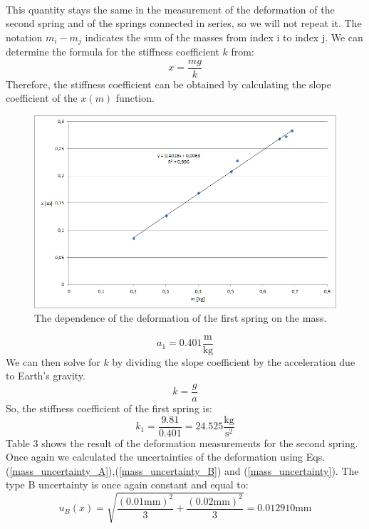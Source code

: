 \documentclass[a4paper,12pt,titlepage,bibliography=numbered]{article}
\begin{document}
\noindent \\This quantity stays the same in the measurement of the deformation of the second spring and of the springs connected in series, so we will not repeat it. The notation \(m_i - m_j\) indicates the sum of the masses from index i to index j. We can determine the formula for the stiffness coefficient \(k\) from:
\begin{equation}
    x = \frac{mg}{k}
\end{equation}
Therefore, the stiffness coefficient can be obtained by calculating the slope coefficient of the $x(m)$ function.
\begin{figure}[H]
\centering
\includegraphics[width=1\textwidth]{fig1.png}
\caption{The dependence of the deformation of the first spring on the mass.}
\label{fig_1}
\end{figure}
\begin{equation}
    a_1 = 0.401 \mathrm{\frac{m}{kg}}
\end{equation}
We can then solve for $k$ by dividing the slope coefficient by the acceleration due to Earth's gravity. \\
\begin{equation}
    k = \frac{g}{a}
    \label{slope_to_stiffness}
\end{equation}
So, the stiffness coefficient of the first spring is: 
\begin{equation}
    k_1 = \frac{9.81}{0.401} = 24.525 \mathrm{\frac{kg}{s^2}}
\end{equation}
\noindent Table 3 shows the result of the deformation measurements for the second spring. Once again we calculated the uncertainties of the deformation using Eqs. (\ref{mass_uncertainty_A}),(\ref{mass_uncertainty_B}) and (\ref{mass_uncertainty}).
\noindent The type B uncertainty is once again constant and equal to: \\
\begin{equation}
    u_B(x) = \sqrt{\frac{(0.01 \mathrm{mm})^2}{3} + \frac{(0.02 \mathrm{mm})^2}{3}} = 0.012910 \mathrm{mm}
\end{equation}
\end{document}
